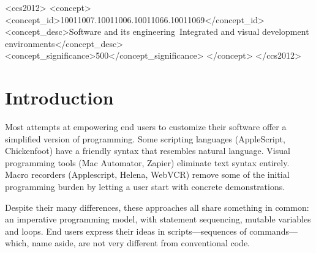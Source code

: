 \documentclass[sigplan,10pt,anonymous,review]{acmart}
\begin{document}
\begin{CCSXML}
<ccs2012>
<concept>
<concept_id>10011007.10011006.10011066.10011069</concept_id>
<concept_desc>Software and its engineering~Integrated and visual development environments</concept_desc>
<concept_significance>500</concept_significance>
</concept>
</ccs2012>
\end{CCSXML}




\maketitle

\hypertarget{introduction}{%
\section{Introduction}\label{introduction}}

Most attempts at empowering end users to customize their software offer
a simplified version of programming. Some scripting languages
(AppleScript, Chickenfoot) have a friendly syntax that resembles natural
language. Visual programming tools (Mac Automator, Zapier) eliminate
text syntax entirely. Macro recorders (Applescript, Helena, WebVCR)
remove some of the initial programming burden by letting a user start
with concrete demonstrations.

Despite their many differences, these approaches all share something in
common: an imperative programming model, with statement sequencing,
mutable variables and loops. End users express their ideas in
scripts---sequences of commands---which, name aside, are not very
different from conventional code.
\end{document}
